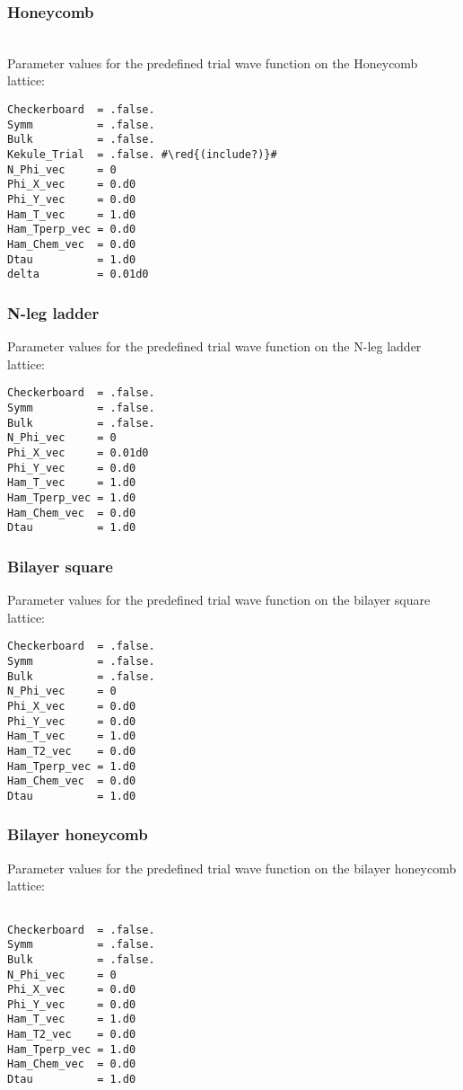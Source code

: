 \subsubsection{Honeycomb}

\\
Parameter values for the predefined trial wave function on the Honeycomb lattice:
\begin{lstlisting}[style=fortran,escapechar=\#]
Checkerboard  = .false.
Symm          = .false.
Bulk          = .false.
Kekule_Trial  = .false. #\red{(include?)}#
N_Phi_vec     = 0
Phi_X_vec     = 0.d0
Phi_Y_vec     = 0.d0
Ham_T_vec     = 1.d0
Ham_Tperp_vec = 0.d0
Ham_Chem_vec  = 0.d0
Dtau          = 1.d0
delta         = 0.01d0
\end{lstlisting}


\subsubsection{N-leg ladder}

Parameter values for the predefined trial wave function on the N-leg ladder lattice:
\begin{lstlisting}[style=fortran]
Checkerboard  = .false.
Symm          = .false.
Bulk          = .false.
N_Phi_vec     = 0
Phi_X_vec     = 0.01d0
Phi_Y_vec     = 0.d0
Ham_T_vec     = 1.d0
Ham_Tperp_vec = 1.d0
Ham_Chem_vec  = 0.d0
Dtau          = 1.d0
\end{lstlisting}


\subsubsection{Bilayer square}

Parameter values for the predefined trial wave function on the bilayer square lattice:
\begin{lstlisting}[style=fortran]
Checkerboard  = .false.
Symm          = .false.
Bulk          = .false.
N_Phi_vec     = 0
Phi_X_vec     = 0.d0
Phi_Y_vec     = 0.d0
Ham_T_vec     = 1.d0
Ham_T2_vec    = 0.d0
Ham_Tperp_vec = 1.d0
Ham_Chem_vec  = 0.d0
Dtau          = 1.d0
\end{lstlisting}


\subsubsection{Bilayer honeycomb}

Parameter values for the predefined trial wave function on the bilayer honeycomb lattice:
\begin{lstlisting}[style=fortran]

Checkerboard  = .false.
Symm          = .false.
Bulk          = .false.
N_Phi_vec     = 0
Phi_X_vec     = 0.d0
Phi_Y_vec     = 0.d0
Ham_T_vec     = 1.d0
Ham_T2_vec    = 0.d0
Ham_Tperp_vec = 1.d0
Ham_Chem_vec  = 0.d0
Dtau          = 1.d0
\end{lstlisting}

